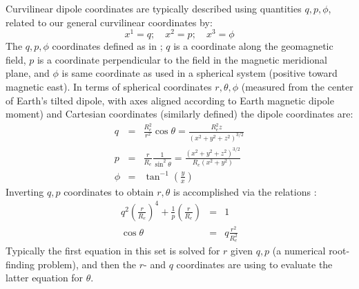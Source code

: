 \documentclass[11pt,letterpaper]{article}
\begin{document}
Curvilinear dipole coordinates are typically described using quantities $q,p,\phi$, related to our general curvilinear coordinates by:  
\begin{equation}
x^1 = q; \quad x^2 = p; \quad x^3 = \phi
\end{equation}
The $q,p,\phi$ coordinates defined as in \citet{Huba:2000}; $q$ is a coordinate along the geomagnetic field, $p$ is a coordinate perpendicular to the field in the magnetic meridional plane, and $\phi$ is same coordinate as used in a spherical system (positive toward magnetic east).  In terms of spherical coordinates $r,\theta,\phi$ (measured from the center of Earth's tilted dipole, with axes aligned according to Earth magnetic dipole moment) and Cartesian coordinates (similarly defined) the dipole coordinates are:  
\begin{eqnarray}
q &=& \frac{R_e^2}{r^2} \cos \theta = \frac{R_e^2 z}{\left( x^2+y^2+z^2\right)^{3/2}}\\
p &=& \frac{r}{R_e} \frac{1}{\sin^2 \theta} = \frac{\left( x^2+y^2+z^2\right)^{3/2}}{R_e \left( x^2 + y^2 \right) } \\
\phi &=& \tan^{-1} \left( \frac{y}{x} \right)
\end{eqnarray}
Inverting $q,p$ coordinates to obtain $r,\theta$ is accomplished via the relations \citep{Huba:2000}:
\begin{eqnarray}
q^2 \left( \frac{r}{R_e}\right)^4 + \frac{1}{p} \left( \frac{r}{R_e}\right)  &=& 1 \\
\cos \theta &=& q \frac{r^2}{R_e^2}
\end{eqnarray}
Typically the first equation in this set is solved for $r$ given $q,p$ (a numerical root-finding problem), and then the $r$- and $q$ coordinates are using to evaluate the latter equation for $\theta$.  
\end{document}
